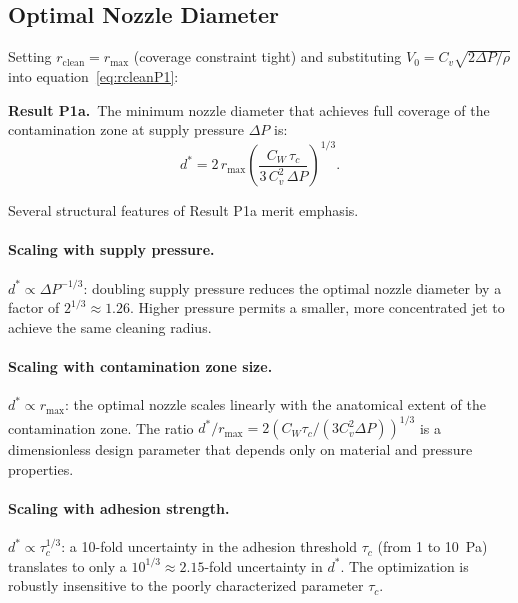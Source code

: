 \documentclass[aps,prfluids,reprint,amsmath,amssymb,floatfix]{revtex4-2}
\begin{document}
\subsection{Optimal Nozzle Diameter}
\label{subsec:P1optimal}

Setting $r_\mathrm{clean} = r_\mathrm{max}$ (coverage constraint tight)
and substituting $V_0 = C_v\sqrt{2\Delta P/\rho}$ into
equation~\eqref{eq:rcleanP1}:

\begin{mdframed}[style=resultbox]
\textbf{Result P1a.}\ The minimum nozzle diameter that achieves full
coverage of the contamination zone at supply pressure $\Delta P$ is:
\begin{equation}
  \boxed{d^* = 2\,r_\mathrm{max}
  \left(\frac{C_W\,\tau_c}{3\,C_v^2\,\Delta P}\right)^{1/3}.}
  \label{eq:dstar}
\end{equation}
\end{mdframed}

Several structural features of Result P1a merit emphasis.

\paragraph{Scaling with supply pressure.}
$d^* \propto \Delta P^{-1/3}$: doubling supply pressure reduces the
optimal nozzle diameter by a factor of $2^{1/3} \approx 1.26$. Higher
pressure permits a smaller, more concentrated jet to achieve the same
cleaning radius.

\paragraph{Scaling with contamination zone size.}
$d^* \propto r_\mathrm{max}$: the optimal nozzle scales linearly with the
anatomical extent of the contamination zone. The ratio $d^*/r_\mathrm{max}
= 2(C_W\tau_c/(3C_v^2\Delta P))^{1/3}$ is a dimensionless design parameter
that depends only on material and pressure properties.

\paragraph{Scaling with adhesion strength.}
$d^* \propto \tau_c^{1/3}$: a 10-fold uncertainty in the adhesion threshold
$\tau_c$ (from 1 to \SI{10}{Pa}) translates to only a $10^{1/3} \approx 2.15$-fold
uncertainty in $d^*$. The optimization is robustly insensitive to the poorly
characterized parameter $\tau_c$.
\end{document}
